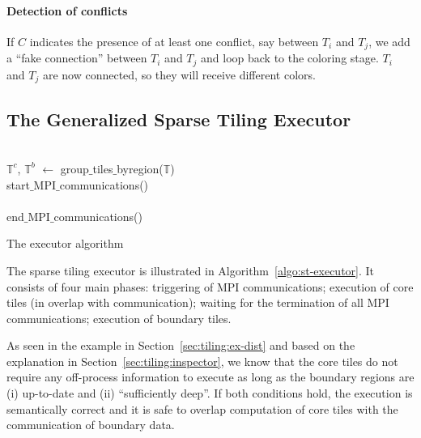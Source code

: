 \paragraph{Detection of conflicts}
If $C$ indicates the presence of at least one conflict, say between $T_i$ and $T_j$, we add a ``fake connection'' between $T_i$ and $T_j$ and loop back to the coloring stage. $T_i$ and $T_j$ are now connected, so they will receive different colors. 



\subsection{The Generalized Sparse Tiling Executor}

\begin{algorithm}[t]
\nonl ~\\
$\mathbb{T}^{c}$, $\mathbb{T}^{b}$ $\gets$ group$\_$tiles$\_$byregion($\mathbb{T}$)\;
\nonl ~\\
start$\_$MPI$\_$communications()\;
\nonl ~\\
\nonl ~\\
end$\_$MPI$\_$communications()\;
\nonl ~\\
\caption{The executor algorithm}
\label{algo:st-executor}
\end{algorithm}


The sparse tiling executor is illustrated in Algorithm~\ref{algo:st-executor}. It consists of four main phases: triggering of MPI communications; execution of core tiles (in overlap with communication); waiting for the termination of all MPI communications; execution of boundary tiles.

As seen in the example in Section~\ref{sec:tiling:ex-dist} and based on the explanation in Section~\ref{sec:tiling:inspector}, we know that the core tiles do not require any off-process information to execute as long as the boundary regions are (i) up-to-date and (ii) ``sufficiently deep''. If both conditions hold, the execution is semantically correct and it is safe to overlap computation of core tiles with the communication of boundary data. 


